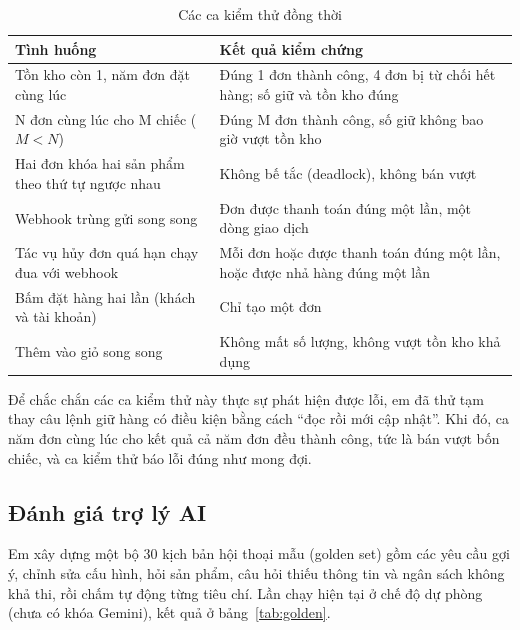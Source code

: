 \begin{table}[H]
\centering\footnotesize\renewcommand{\arraystretch}{1.15}
\begin{tabular}{|L{4.6cm}|L{9.1cm}|}
\hline
\textbf{Tình huống} & \textbf{Kết quả kiểm chứng} \\ \hline
Tồn kho còn 1, năm đơn đặt cùng lúc & Đúng 1 đơn thành công, 4 đơn bị từ chối hết hàng; số giữ và tồn kho đúng \\ \hline
N đơn cùng lúc cho M chiếc ($M < N$) & Đúng M đơn thành công, số giữ không bao giờ vượt tồn kho \\ \hline
Hai đơn khóa hai sản phẩm theo thứ tự ngược nhau & Không bế tắc (deadlock), không bán vượt \\ \hline
Webhook trùng gửi song song & Đơn được thanh toán đúng một lần, một dòng giao dịch \\ \hline
Tác vụ hủy đơn quá hạn chạy đua với webhook & Mỗi đơn hoặc được thanh toán đúng một lần, hoặc được nhả hàng đúng một lần \\ \hline
Bấm đặt hàng hai lần (khách và tài khoản) & Chỉ tạo một đơn \\ \hline
Thêm vào giỏ song song & Không mất số lượng, không vượt tồn kho khả dụng \\ \hline
\end{tabular}
\caption{Các ca kiểm thử đồng thời}
\label{tab:dong-thoi}
\end{table}

Để chắc chắn các ca kiểm thử này thực sự phát hiện được lỗi, em đã thử tạm thay câu lệnh giữ hàng có điều kiện bằng cách ``đọc rồi mới cập nhật''. Khi đó, ca năm đơn cùng lúc cho kết quả cả năm đơn đều thành công, tức là bán vượt bốn chiếc, và ca kiểm thử báo lỗi đúng như mong đợi.

\subsection{Đánh giá trợ lý AI}

Em xây dựng một bộ 30 kịch bản hội thoại mẫu (golden set) gồm các yêu cầu gợi ý, chỉnh sửa cấu hình, hỏi sản phẩm, câu hỏi thiếu thông tin và ngân sách không khả thi, rồi chấm tự động từng tiêu chí. Lần chạy hiện tại ở chế độ dự phòng (chưa có khóa Gemini), kết quả ở bảng~\ref{tab:golden}.

